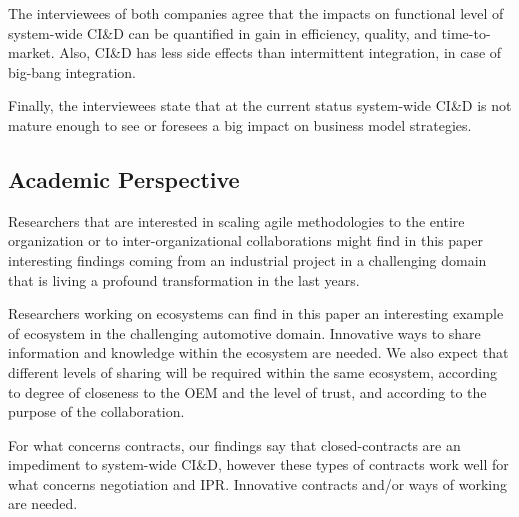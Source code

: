 The interviewees of both companies agree that the impacts on functional level of system-wide CI\&D %
can be quantified in gain in efficiency, quality, and time-to-market. Also, CI\&D has less side effects than intermittent integration, in case of big-bang integration.  

Finally, the interviewees state that at the current status system-wide CI\&D is not mature enough to see or foresees a big impact on business model strategies. 

\subsection{Academic Perspective}

Researchers that are interested in scaling agile methodologies to the entire organization or to inter-organizational collaborations might find in this paper interesting findings coming from an industrial project in a challenging domain that is living a profound transformation in the last years. 

Researchers working on ecosystems can find in this paper an interesting example of ecosystem in the challenging automotive domain. Innovative ways to share information and knowledge within the ecosystem are needed. %
We also expect that different levels of sharing will be required within the same ecosystem, according to degree of closeness to the OEM and the level of trust, and according to the purpose of the collaboration.

For what concerns contracts, our findings say that closed-contracts are an impediment to system-wide CI\&D, however these types of contracts work well for what concerns negotiation and IPR. Innovative contracts and/or ways of working are needed.

% 

